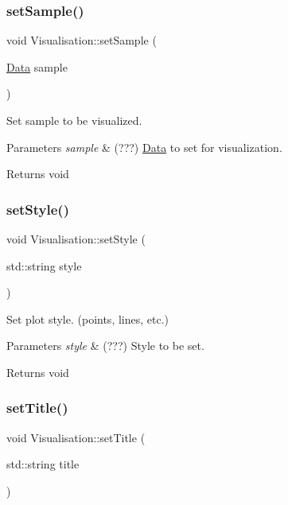 \subsubsection{\texorpdfstring{set\+Sample()}{setSample()}}
{\footnotesize\ttfamily void Visualisation\+::set\+Sample (\begin{DoxyParamCaption}\item[{\hyperlink{class_data}{Data}}]{sample }\end{DoxyParamCaption})}



Set sample to be visualized. 


\begin{DoxyParams}{Parameters}
{\em sample} & (???) \hyperlink{class_data}{Data} to set for visualization. \\
\hline
\end{DoxyParams}
\begin{DoxyReturn}{Returns}
void 
\end{DoxyReturn}
\mbox{\label{class_visualisation_a2d29fee9180bcb2fd5cb6fc78253ac5b}} 
\subsubsection{\texorpdfstring{set\+Style()}{setStyle()}}
{\footnotesize\ttfamily void Visualisation\+::set\+Style (\begin{DoxyParamCaption}\item[{std\+::string}]{style }\end{DoxyParamCaption})}



Set plot style. (points, lines, etc.) 


\begin{DoxyParams}{Parameters}
{\em style} & (???) Style to be set. \\
\hline
\end{DoxyParams}
\begin{DoxyReturn}{Returns}
void 
\end{DoxyReturn}
\mbox{\label{class_visualisation_ac217fcae4984edeb003bfcd208a253de}} 
\subsubsection{\texorpdfstring{set\+Title()}{setTitle()}}
{\footnotesize\ttfamily void Visualisation\+::set\+Title (\begin{DoxyParamCaption}\item[{std\+::string}]{title }\end{DoxyParamCaption})}



